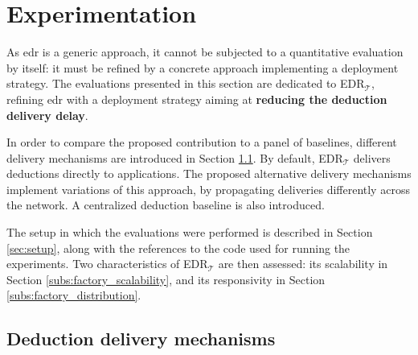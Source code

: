\documentclass{iosart2c}
\newcommand{\edrt}{EDR$_{\mathcal{T}}$\xspace}
\begin{document}
\section{Experimentation}
\label{sec:experimentations}
As \gls{edr} is a generic approach, it cannot be subjected to a quantitative evaluation by itself: it must be refined by a concrete approach implementing a deployment strategy. 
The evaluations presented in this section are dedicated to \edrt, refining \gls{edr} with a deployment strategy aiming at \textbf{reducing the deduction delivery delay}.

In order to compare the proposed contribution to a panel of baselines, different delivery mechanisms are introduced in Section \textsection \ref{sec:deductions_propagation_strategies}. 
By default, \edrt delivers deductions directly to applications. 
The proposed alternative delivery mechanisms implement variations of this approach, by propagating deliveries differently across the network.
A centralized deduction baseline is also introduced.

The setup in which the evaluations were performed is described in Section \textsection \ref{sec:setup}, along with the references to the code used for running the experiments.
Two characteristics of \edrt are then assessed: its scalability in Section \textsection\ref{subs:factory_scalability}, and its responsivity in Section \textsection\ref{subs:factory_distribution}.

\subsection{Deduction delivery mechanisms}
\label{sec:deductions_propagation_strategies}
\end{document}
